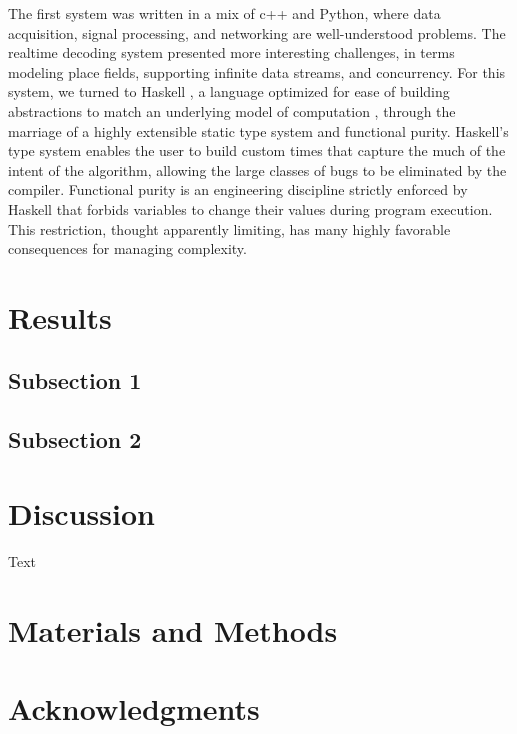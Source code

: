 \documentclass[10pt]{article}
\begin{document}
The first system was written in a mix of c++ and Python, where data acquisition, signal processing, and networking are well-understood problems. The realtime decoding system presented more interesting challenges, in terms modeling place fields, supporting infinite data streams, and concurrency. For this system, we turned to Haskell \cite{HASKELLREPORT}, a language optimized for ease of building abstractions to match an underlying model of computation \cite{WHYFPMATTERS}, through the marriage of a highly extensible static type system and functional purity. Haskell's type system enables the user to build custom times that capture the much of the intent of the algorithm, allowing the large classes of bugs to be eliminated by the compiler. Functional purity is an engineering discipline strictly enforced by Haskell that forbids variables to change their values during program execution. This restriction, thought apparently limiting, has many highly favorable consequences for managing complexity.





\section*{Results}

\subsection*{Subsection 1}

\subsection*{Subsection 2}

\section*{Discussion}
Text


\section*{Materials and Methods}

\section*{Acknowledgments}
\end{document}
